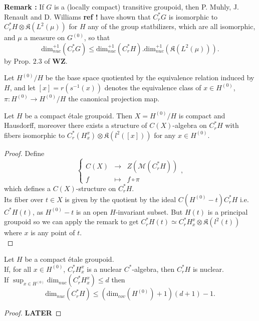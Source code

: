 \textbf{Remark :} If $G$ is a (locally compact) transitive groupoid, then P. Muhly, J. Renault and D. Williams \textbf{ref !} have shown that $C^*_rG$ is isomorphic to $C^*_r H \otimes \mathfrak K(L^2(\mu))$ for $H$ any of the group statbilizers, which are all isomorphic, and $\mu$ a measure on $G^{(0)}$, so that
\[\text{dim}_{nuc}^{+1}(C_r^*G)\leq \text{dim}_{nuc}^{+1}(C_r^*H).\text{dim}_{nuc}^{+1}(\mathfrak K(L^2(\mu))).\]
by Prop. $2.3$ of \textbf{WZ}.

Let $H^{(0)}/H$ be the base space quotiented by the equivalence relation induced by $H$, and let $[x]=r(s^{-1}(x))$ denotes the equivalence class of $x\in H^{(0)}$, $\pi : H^{(0)}\rightarrow H^{(0)}/H$ the canonical projection map.\\  

\begin{prop}
Let $H$ be a compact étale groupoid. Then $X=H^{(0)}/H$ is compact and Hausdorff, moreover there exists a structure of $C(X)$-algebra on $C^*_rH$ with fibers isomorphic to $C^*_r(H_x^x)\otimes \mathfrak K(l^2([x]))$ for any $x\in H^{(0)}$.
\end{prop}

\begin{proof}
Define
\[\left\{\begin{array}{rcl} C(X) &\rightarrow & Z(\mathcal M(C^*_r H)) \\ f &\mapsto & f\circ \pi \end{array}\right. ,\]
which defines a $C(X)$-structure on $C^*_rH$.\\
Its fiber over $t\in X$ is given by the quotient by the ideal $C(H^{(0)}- t) C^*_r H $ i.e. $C^* H(t)$, as $H^{(0)}-t$ is an open $H$-invariant subset. But $H(t)$ is a principal groupoid so we can apply the remark to get $C^*_r H(t)\simeq C^*_r H_x^x \otimes \mathfrak K(l^2(t))$ where $x$ is any point of $t$.\\
\end{proof}

\begin{prop}
Let $H$ be a compact étale groupoid. \\
If, for all $x\in H^{(0)}$, $C^*_rH_x^x$ is a nuclear $C^*$-algebra, then $C^*_r H$ is nuclear.\\
If $\sup_{x\in H^{(0)}}\text{dim}_{nuc}(C^*_rH_x^x)\leq d$ then
\[\text{dim}_{nuc}(C^*_r H)\leq (\text{dim}_{cov}(H^{(0)})+1)(d+1)-1. \]
\end{prop}

\begin{proof}
\textbf{LATER}
\end{proof}








